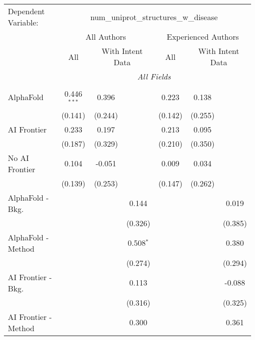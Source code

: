 \begingroup
\centering
\begin{tabular}{lcccccc}
   \tabularnewline \midrule \midrule
   Dependent Variable: & \multicolumn{6}{c}{num\_uniprot\_structures\_w\_disease}\\
 & \multicolumn{3}{c}{All Authors} & \multicolumn{3}{c}{Experienced Authors} \\
\cmidrule(lr){2-4} \cmidrule(lr){5-7}
 & \multicolumn{1}{c}{All} & \multicolumn{2}{c}{With Intent Data} & \multicolumn{1}{c}{All} & \multicolumn{2}{c}{With Intent Data} \\
\cmidrule(lr){2-2} \cmidrule(lr){3-4} \cmidrule(lr){5-5} \cmidrule(lr){6-7}
 & \multicolumn{6}{c}{\textit{All Fields}} \\ \\
   AlphaFold               & 0.446$^{***}$ & 0.396   &               & 0.223   & 0.138   &   \\   
                           & (0.141)       & (0.244) &               & (0.142) & (0.255) &   \\   
   AI Frontier             & 0.233         & 0.197   &               & 0.213   & 0.095   &   \\   
                           & (0.187)       & (0.329) &               & (0.210) & (0.350) &   \\   
   No AI Frontier          & 0.104         & -0.051  &               & 0.009   & 0.034   &   \\   
                           & (0.139)       & (0.253) &               & (0.147) & (0.262) &   \\   
   AlphaFold - Bkg.        &               &         & 0.144         &         &         & 0.019\\   
                           &               &         & (0.326)       &         &         & (0.385)\\   
   AlphaFold - Method      &               &         & 0.508$^{*}$   &         &         & 0.380\\   
                           &               &         & (0.274)       &         &         & (0.294)\\   
   AI Frontier - Bkg.      &               &         & 0.113         &         &         & -0.088\\   
                           &               &         & (0.316)       &         &         & (0.325)\\   
   AI Frontier - Method    &               &         & 0.300         &         &         & 0.361\\   

\end{tabular}
